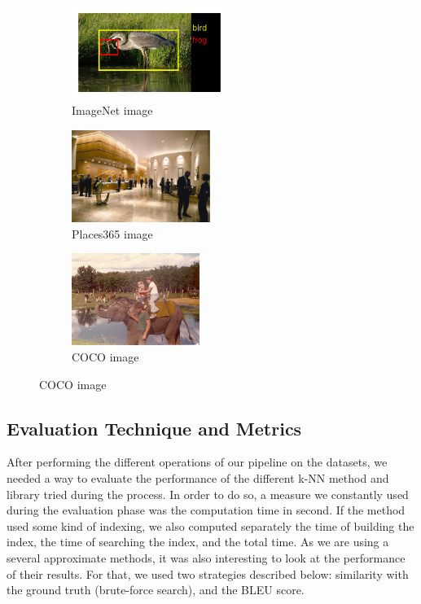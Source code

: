 \documentclass[a4paper]{article}
\begin{document}
\begin{figure}
  \begin{subfigure}[b]{0.32\textwidth}
    \includegraphics[width=\textwidth, height=3cm]{imagenet-img}
    \caption{ImageNet image}
    \label{fig:imagenet-img}
  \end{subfigure}
  \begin{subfigure}[b]{0.32\textwidth}
    \includegraphics[width=\textwidth, height=3cm]{places-img}
    \caption{Places365 image}
    \label{fig:places-img}
  \end{subfigure}
  \begin{subfigure}[b]{0.32\textwidth}
    \includegraphics[width=\textwidth, height=3cm]{coco-img}
    \caption{COCO image}
    \label{fig:coco-img}
  \end{subfigure}
\end{figure}

\subsection{Evaluation Technique and Metrics}

After performing the different operations of our pipeline on the datasets, we needed a way to evaluate the performance of the different k-NN method and library tried during the process. In order to do so, a measure we constantly used during the evaluation phase was the computation time in second. If the method used some kind of indexing, we also computed separately the time of building the index, the time of searching the index, and the total time. As we are using a several approximate methods, it was also interesting to look at the performance of their results. For that, we used two strategies described below: similarity with the ground truth (brute-force search), and the BLEU score. 
\end{document}
